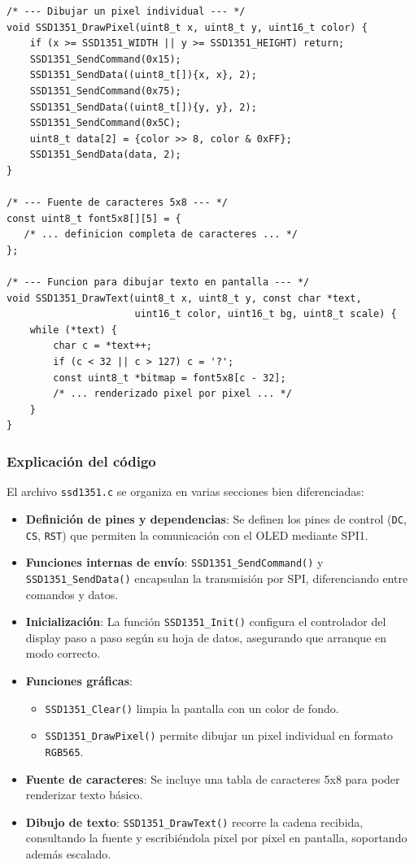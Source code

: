 \documentclass[a4paper,12pt]{article}
\begin{document}
\begin{lstlisting}[caption={Implementación de la librería SSD1351 en el archivo \texttt{ssd1351.c}}, label={lst:ssd1351}]
/* --- Dibujar un pixel individual --- */
void SSD1351_DrawPixel(uint8_t x, uint8_t y, uint16_t color) {
    if (x >= SSD1351_WIDTH || y >= SSD1351_HEIGHT) return;
    SSD1351_SendCommand(0x15); 
    SSD1351_SendData((uint8_t[]){x, x}, 2);
    SSD1351_SendCommand(0x75);
    SSD1351_SendData((uint8_t[]){y, y}, 2);
    SSD1351_SendCommand(0x5C);
    uint8_t data[2] = {color >> 8, color & 0xFF};
    SSD1351_SendData(data, 2);
}

/* --- Fuente de caracteres 5x8 --- */
const uint8_t font5x8[][5] = {
   /* ... definicion completa de caracteres ... */
};

/* --- Funcion para dibujar texto en pantalla --- */
void SSD1351_DrawText(uint8_t x, uint8_t y, const char *text,
                      uint16_t color, uint16_t bg, uint8_t scale) {
    while (*text) {
        char c = *text++;
        if (c < 32 || c > 127) c = '?';
        const uint8_t *bitmap = font5x8[c - 32];
        /* ... renderizado pixel por pixel ... */
    }
}
\end{lstlisting}

\subsubsection{Explicación del código}

El archivo \texttt{ssd1351.c} se organiza en varias secciones bien diferenciadas:

\begin{itemize}
    \item \textbf{Definición de pines y dependencias}: Se definen los pines de control (\texttt{DC}, \texttt{CS}, \texttt{RST}) que permiten la comunicación con el OLED mediante SPI1.
    \item \textbf{Funciones internas de envío}: \texttt{SSD1351\_SendCommand()} y \texttt{SSD1351\_SendData()} encapsulan la transmisión por SPI, diferenciando entre comandos y datos.
    \item \textbf{Inicialización}: La función \texttt{SSD1351\_Init()} configura el controlador del display paso a paso según su hoja de datos, asegurando que arranque en modo correcto.
    \item \textbf{Funciones gráficas}: 
    \begin{itemize}
        \item \texttt{SSD1351\_Clear()} limpia la pantalla con un color de fondo.
        \item \texttt{SSD1351\_DrawPixel()} permite dibujar un pixel individual en formato \texttt{RGB565}.
    \end{itemize}
    \item \textbf{Fuente de caracteres}: Se incluye una tabla de caracteres 5x8 para poder renderizar texto básico.
    \item \textbf{Dibujo de texto}: \texttt{SSD1351\_DrawText()} recorre la cadena recibida, consultando la fuente y escribiéndola pixel por pixel en pantalla, soportando además escalado.
\end{itemize}
\end{document}
